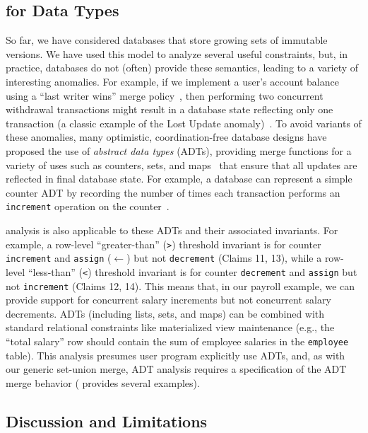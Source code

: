 \subsection{\iconfluence for Data Types}

So far, we have considered databases that store growing sets of
immutable versions. We have used this model to analyze several useful
constraints, but, in practice, databases do not (often) provide these
semantics, leading to a variety of interesting anomalies. For example,
if we implement a user's account balance using a ``last writer wins''
merge policy~\cite{crdt}, then performing two concurrent withdrawal
transactions might result in a database state reflecting only one
transaction (a classic example of the Lost Update
anomaly)~\cite{adya-isolation,hat-vldb}. To avoid variants of these
anomalies, many optimistic, coordination-free database designs have
proposed the use of \textit{abstract data types} (ADTs), providing
merge functions for a variety of uses such as counters, sets, and
maps~\cite{crdt,atomictransactions,weihl-thesis,blooml} that ensure
that all updates are reflected in final database state. For example, a
database can represent a simple counter ADT by recording the number of
times each transaction performs an \texttt{increment} operation on the
counter~\cite{crdt}.

\iconfluence analysis is also applicable to these ADTs and their
associated invariants. For example, a row-level ``greater-than''
(\texttt{>}) threshold invariant is \iconfluent for counter
\texttt{increment} and \texttt{assign} ($\gets$) but not
\texttt{decrement} (Claims 11, 13), while a row-level ``less-than''
(\texttt{<}) threshold invariant is \iconfluent for counter
\texttt{decrement} and \texttt{assign} but not \texttt{increment}
(Claims 12, 14). This means that, in our payroll example, we can
provide \cfree support for concurrent salary increments but not
concurrent salary decrements. ADTs (including lists, sets, and maps)
can be combined with standard relational constraints like materialized
view maintenance (e.g., the ``total salary'' row should contain the
sum of employee salaries in the \texttt{employee} table).  This
analysis presumes user program explicitly use ADTs, and, as with our
generic set-union merge, \iconfluence ADT analysis requires a
specification of the ADT merge behavior (\rappendix{\appapply}
provides several examples).

\subsection{Discussion and Limitations}


